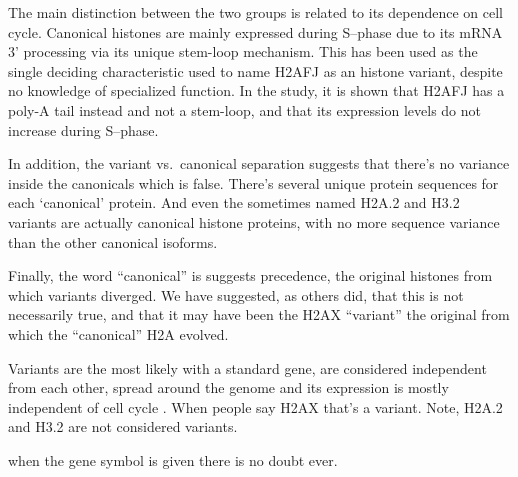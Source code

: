   The main distinction between the two groups is related to its dependence on
  cell cycle. Canonical histones are mainly expressed during S--phase due to
  its mRNA 3' processing via its unique stem-loop mechanism. This has been used
  as the single deciding characteristic used to name H2AFJ as an histone variant,
  despite no knowledge of specialized function\citep{h2afj-report}. In the study,
  it is shown that H2AFJ has a poly-A tail instead and not a stem-loop, and that
  its expression levels do not increase during S--phase.


  In addition, the variant vs.~canonical separation suggests that there's no variance inside
  the canonicals which is false. There's several unique protein sequences for each
  `canonical' protein. And even the sometimes named H2A.2 and H3.2 variants are actually
  canonical histone proteins, with no more sequence variance than the other canonical
  isoforms.


  Finally, the word ``canonical'' is suggests precedence, the original histones
  from which variants diverged. We have suggested, as others did, that this
  is not necessarily true, and that it may have been the H2AX ``variant'' the
  original from which the ``canonical'' H2A evolved\citep{our-H2AX-review, henikoff2010-variants-evolution}.


  Variants are the most likely with a standard gene, are considered independent from each other,
  spread around the genome and its expression is mostly independent of cell cycle . When people say H2AX that's
  a variant. Note, H2A.2 and H3.2 are not considered variants.



  when the gene
  symbol is given there is no doubt ever.

